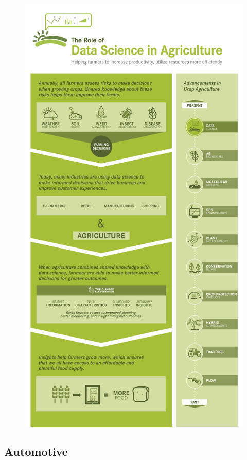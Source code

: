 \documentclass[]{book}
\begin{document}
\begin{figure}
\centering
\includegraphics{14.jpg}
\caption{}
\end{figure}

\subsection{Automotive}\label{automotive}
\end{document}
